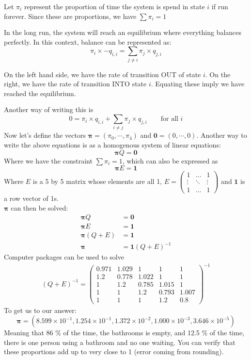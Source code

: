 Let $\pi_i$ represent the proportion of time the system is spend in state $i$ if run forever. Since these are proportions, we have $\sum\pi_i = 1$

In the long run, the system will reach an equilibrium where everything balances perfectly. In this context, balance can be represented as:
$$ \pi_i  \times -q_{i, i} = \sum_{j \neq i} \pi_j \times q_{j, i} $$

On the left hand side, we have the rate of transition OUT of state $ i $. On the right, we have the rate of transition INTO state $ i $. Equating these imply we have reached the equilibrium.

Another way of writing this is
$$ 0 = \pi_i  \times q_{i, i} + \sum_{i \neq j} \pi_j \times q_{j, i} \qquad \text{for all  }i$$
Now let's define the vectors $\boldsymbol{\pi}= (\pi_0, \cdots, \pi_4)$ and $\mathbf{0}= (0, \cdots, 0)$. Another way to write the above equations is as a homogenous system of linear equations:
$$ \boldsymbol{\pi}Q = \mathbf{0}$$
Where we have the constraint $ \sum\pi_i = 1 $, which can also be expressed as $$\boldsymbol{\pi} E = \mathbf{1} $$
Where $E$ is a 5 by 5 matrix whose elements are all 1, 
$E = \begin{pmatrix}
1		&	\dots	& 1\\
\vdots	&	\ddots	& \vdots\\
1		&	\dots	& 1

\end{pmatrix}
$ and $\mathbf{1} $ is a row vector of 1s.\\

$\boldsymbol{\pi}$ can then be solved:
\begin{align*}
	 \boldsymbol{\pi}Q &= \mathbf{0}\\
	 \boldsymbol{\pi} E &= \mathbf{1}\\
	 \boldsymbol{\pi} (Q + E) &= \mathbf{1}\\
	 \boldsymbol{\pi} & =  \mathbf{1}(Q+E)^{-1}
\end{align*}
Computer packages can be used to solve
\begin{align*}
	(Q+E)^{-1} = \begin{pmatrix}
	0.971	&	1.029	&	1 		& 1 		& 1	\\
	1.2  	&	0.778	& 1.022 	& 1 		& 1	\\
	1  		&	1.2		&0.785		&1.015 		& 1	\\
	1  		&	1		&	1.2 	&0.793		& 1.007\\
	1		&	1		&	1		& 1.2 		& 0.8
	\end{pmatrix}^{-1}
\end{align*}
To get us to our answer:
$$ \boldsymbol{\pi} = ( 8.599\times 10^{-1}, 1.254\times 10^{-1}, 1.372\times 10^{-2}, 1.000\times 10^{-3}, 3.646\times 10^{-5}) $$
Meaning that 86 \% of the time, the bathrooms is empty, and 12.5 \% of the time, there is one person using a bathroom and no one waiting. You can verify that these proportions add up to very close to 1 (error coming from rounding).

